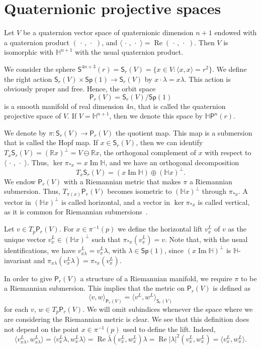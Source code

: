 \documentclass[12pt, a4paper]{amsart}
\newcommand{\R}{\mathbb{R}}
\renewcommand{\H}{\mathbb{H}}
\renewcommand{\Re}{\operatorname{Re}}
\renewcommand{\Im}{\operatorname{Im}}
\newcommand{\Sp}{\mathsf{Sp}}
\theoremstyle{remark}
\begin{document}
\section{Quaternionic projective spaces}

Let $V$ be a quaternion vector space of quaternionic dimension $n+1$ endowed with a quaternion product $(\,\cdot\,,\,\cdot\,\,)$, and $\langle\,\cdot\,,\,\cdot\,\,\rangle=\Re(\,\cdot\,,\,\cdot\,\,)$.
Then $V$ is isomorphic with $\H^{n+1}$ with the usual quaternion product.

We consider the sphere $\mathsf{S}^{4n+3}(r)=\mathsf{S}_r(V)=\{{x}\in V:\langle {x},{x}\rangle=r^2\}$.
We define the right action $\mathsf{S}_r(V)\times\Sp(1)\to\mathsf{S}_r(V)$ by ${x}\cdot \lambda={x}\lambda$.
This action is obviously proper and free. 
Hence, the orbit space 
\[
\mathsf{P}_r(V)=\mathsf{S}_r(V)/\Sp(1)
\]
is a smooth manifold of real dimension $4n$, that is called the quaternion projective space of $V$.
If $V=\H^{n+1}$, then we denote this space by $\H \mathsf{P}^n(r)$.

We denote by $\pi\colon\mathsf{S}_r(V)\to\mathsf{P}_r(V)$ the quotient map.
This map is a submersion that is called the Hopf map.
If ${x}\in\mathsf{S}_r(V)$, then we can identify $T_{x}\mathsf{S}_r(V)=(\R{x})^\perp=V\ominus\R{x}$, the orthogonal complement of ${x}$ with respect to $\langle\,\cdot\,,\,\cdot\,\,\rangle$.
Thus, $\ker\pi_{*{x}}={x}\Im\H$, and we have an orthogonal decomposition 
\[
T_{x}\mathsf{S}_r(V)=({x}\Im\H)\oplus(\H{x})^\perp.
\]
We endow $\mathsf{P}_r(V)$ with a Riemannian metric that makes $\pi$ a Riemannian submersion.
Thus, $T_{\pi({x})}\mathsf{P}_r(V)$ becomes isometric to $(\H{x})^\perp$ through $\pi_{*{x}}$.
A vector in $(\H x)^\perp$ is called horizontal, and a vector in $\ker\pi_{*x}$ is called vertical, as it is common for Riemannian submersions~\cite{ONeill}.

Let $v\in T_{p}\mathsf{P}_r(V)$.
For ${x}\in\pi^{-1}(p)$ we define the horizontal lift $v^L_{x}$ of $v$ as the unique vector $v_x^L\in(\H{x})^\perp$ such that $\pi_{*{x}}(v^L_{x})=v$.
Note that, with the usual identifications, we have $v_{x\lambda}^L=v_x^L\lambda$, with $\lambda\in\Sp(1)$, since $(x\Im\H)^\perp$ is $\H$-invariant and $\pi_{x\lambda}(v_x^L\lambda)=\pi_{*x}(v_x^L)$.
\medskip

In order to give $\mathsf{P}_r(V)$ a structure of a Riemannian manifold, we require $\pi$ to be a Riemannian submersion.
This implies that the metric on $\mathsf{P}_r(V)$ is defined as 
\[
\langle v,w\rangle_{\mathsf{P}_r(V)}=\langle v^L,w^L\rangle_{\mathsf{S}_r(V)}
\] 
for each $v$, $w\in T_p\mathsf{P}_r(V)$.
We will omit subindices whenever the space where we are considering the Riemannian metric is clear.
We see that this definition does not depend on the point ${x}\in\pi^{-1}(p)$ used to define the lift.
Indeed,
\[
\langle v^L_{{x}\lambda},w^L_{{x}\lambda}\rangle=
\langle v^L_{{x}}\lambda,w^L_{{x}}\lambda\rangle=
\Re\bar{\lambda}(v^L_{x},w^L_{x})\lambda=
\Re\lvert\lambda\rvert^2(v^L_{x},w^L_{x})=
\langle v^L_{x},w^L_{x}\rangle.
\]
\end{document}
